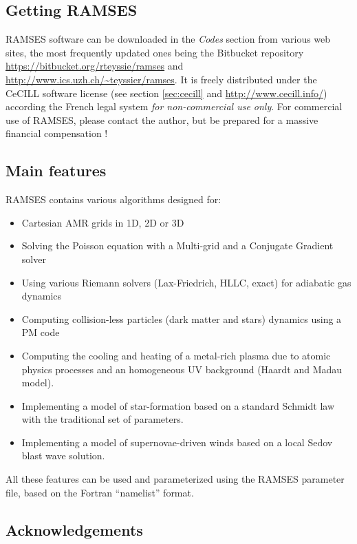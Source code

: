 \subsection{Getting RAMSES}

RAMSES software can be downloaded in the \emph{Codes} section from various web
sites, the most frequently updated ones being the Bitbucket repository 
\url{https://bitbucket.org/rteyssie/ramses} and
\url{http://www.ics.uzh.ch/~teyssier/ramses}.  It is freely distributed under the CeCILL
software license (see section \ref{sec:cecill} and
\url{http://www.cecill.info/}) according the French legal system \emph{for
non-commercial use only}. For commercial use of RAMSES, please contact the
author, but be prepared for a massive financial compensation !

\subsection{Main features}
RAMSES contains various algorithms designed for:

\begin{itemize}
   \item Cartesian AMR grids in 1D, 2D or 3D
   \item Solving the Poisson equation with a Multi-grid and a Conjugate
Gradient solver
   \item Using various Riemann solvers (Lax-Friedrich, HLLC, exact) for
adiabatic gas dynamics
   \item Computing collision-less particles (dark matter and stars)
dynamics using a PM code
   \item Computing the cooling and heating of a metal-rich plasma due to
atomic physics processes and an homogeneous UV background (Haardt and
Madau model).
   \item Implementing a model of star-formation based on a standard
Schmidt law with the traditional set of parameters.
   \item Implementing a model of supernovae-driven winds based on a
local Sedov blast wave solution.
\end{itemize}

All these features can be used and parameterized using the RAMSES
parameter file, based on the Fortran ``namelist'' format.

\subsection{Acknowledgements}

